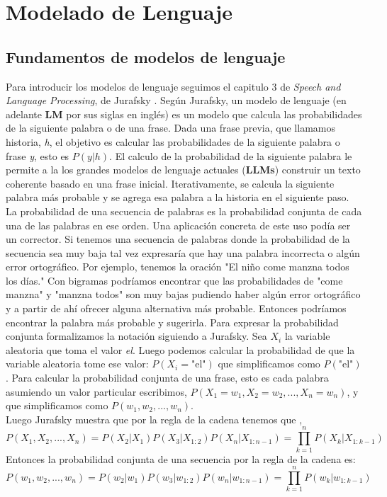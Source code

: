 \documentclass{book}
\begin{document}







\chapter{Modelado de Lenguaje}

\section{Fundamentos de modelos de lenguaje}
Para introducir los modelos de lenguaje seguimos el capitulo 3 de \textit{Speech and Language Processing}, de Jurafsky \cite{jurafsky2014speech}. Según Jurafsky, un modelo de lenguaje (en adelante \textbf{LM} por sus siglas en inglés) es un modelo que calcula las probabilidades de la siguiente palabra o de una frase. Dada una frase previa, que llamamos historia, \textit{h}, el objetivo es calcular las probabilidades de la siguiente palabra o frase \textit{y}, esto es $P(y|h)$. El calculo de la probabilidad de la siguiente palabra le permite a la los grandes modelos de lenguaje actuales (\textbf{LLMs}) construir un texto coherente basado en una frase inicial. Iterativamente, se calcula la siguiente palabra más probable y se agrega esa palabra a la historia en el siguiente paso. \\
La probabilidad de una secuencia de palabras es la probabilidad conjunta de cada una de las palabras en ese orden. Una aplicación concreta de este uso podía ser un corrector. Si tenemos una secuencia de palabras donde la probabilidad de la secuencia sea muy baja tal vez expresaría que hay una palabra incorrecta o algún error ortográfico. Por ejemplo, tenemos la oración "El niño come manzna todos los días." Con bigramas podríamos encontrar que las probabilidades de "come manzna" y "manzna todos" son muy bajas pudiendo haber algún error ortográfico y a partir de ahí ofrecer alguna alternativa más probable. Entonces podríamos encontrar la palabra más probable y sugerirla.  
Para expresar la probabilidad conjunta formalizamos la notación siguiendo a Jurafsky. Sea $X_i$ la variable aleatoria que toma el valor \textit{el}. Luego podemos calcular la probabilidad de que la variable aleatoria tome ese valor: $P(X_i=\text{"el"})$ que simplificamos como $P(\text{"el"})$. Para calcular la probabilidad conjunta de una frase, esto es cada palabra asumiendo un valor particular escribimos, $P(X_1=w_1,X_2=w_2,...,X_n=w_n)$, y que simplificamos como $P(w_1, w_2, ..., w_n)$. \\
Luego Jurafsky muestra que por la regla de la cadena tenemos que ,
\begin{equation}
P(X_1,X_2, ...,X_n) = P(X_2|X_1)P(X_3|X_{1:2})P(X_n|X_{1:n-1})    
= \prod_{k=1}^{n} P(X_k|X_{1:k-1})
\end{equation}
Entonces la probabilidad conjunta de una secuencia por la regla de la cadena es:
\begin{equation}
P(w_1,w_2, ...,w_n) = P(w_2|w_1)P(w_3|w_{1:2})P(w_n|w_{1:n-1})    
= \prod_{k=1}^{n} P(w_k|w_{1:k-1})
\label{eq:regla_cadena}
\end{equation}
\end{document}
